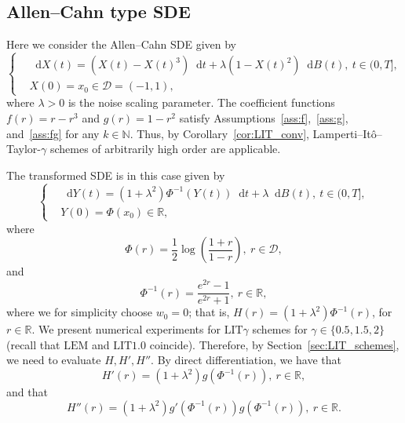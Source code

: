 \documentclass[11pt]{amsart}
\newcommand*\diff{\mathop{}\!\mathrm{d}}
\newcommand{\D}{\mathcal{D}}
\newcommand{\LIT}{\textrm{LIT}}
\newcommand{\LEM}{\textrm{LEM}}
\begin{document}
{\subsection{Allen--Cahn type SDE}
Here we consider the Allen--Cahn SDE given by
\begin{equation}\label{eq:AC_SDE}
\left\lbrace
\begin{aligned}
& \diff X(t) = \left( X(t) - X(t)^{3} \right) \diff t + \lambda \left( 1 - X(t)^{2} \right) \diff B(t),\ t \in (0,T], \\ 
& X(0) = x_{0} \in \D = (-1,1),
\end{aligned}
\right.
\end{equation}
where $\lambda > 0$ is the noise scaling parameter. The coefficient functions $f(r) = r - r^3$ and $g(r) = 1 - r^2$ satisfy Assumptions~\ref{ass:f},~\ref{ass:g}, and~\ref{ass:fg} for any $k \in \mathbb{N}$. Thus, by Corollary~\ref{cor:LIT_conv}, Lamperti--Itô--Taylor-$\gamma$ schemes of arbitrarily high order are applicable.

The transformed SDE is in this case given by
\begin{equation*}
\left\lbrace
\begin{aligned}
& \diff Y(t) = (1 + \lambda^{2}) \Phi^{-1}(Y(t)) \diff t + \lambda \diff B(t),\ t \in (0,T], \\ 
& Y(0) = \Phi(x_{0}) \in \mathbb{R},
\end{aligned}
\right.
\end{equation*}
where
\begin{equation*}
\Phi(r) = \frac{1}{2} \log \left( \frac{1+r}{1-r} \right),\ r \in \D,
\end{equation*}
and
\begin{equation*}
\Phi^{-1}(r) = \frac{e^{2r}-1}{e^{2r}+1},\ r \in \mathbb{R},
\end{equation*}
where we for simplicity choose $w_{0}=0$; that is, $H(r) = (1 + \lambda^{2}) \Phi^{-1}(r)$, for $r \in \mathbb{R}$. We present numerical experiments for $\LIT \gamma$ schemes for $\gamma \in \{ 0.5,1.5,2 \}$ (recall that $\LEM$ and $\LIT1.0$ coincide). Therefore, by Section~\ref{sec:LIT_schemes}, we need to evaluate $H,H',H''$. By direct differentiation, we have that
\begin{equation*}
H'(r) = (1 + \lambda^{2}) g(\Phi^{-1}(r)),\ r \in \mathbb{R},
\end{equation*}
and that
\begin{equation*}
H''(r) = (1 + \lambda^{2}) g'(\Phi^{-1}(r)) g(\Phi^{-1}(r)),\ r \in \mathbb{R}.
\end{equation*}

}
\end{document}
